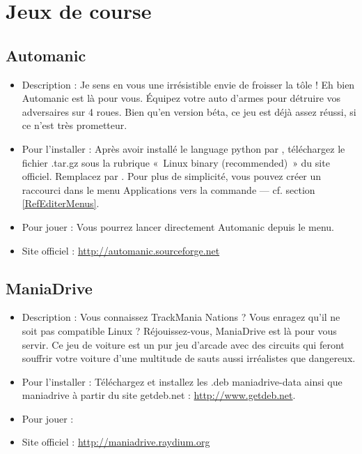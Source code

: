 \section{Jeux de course}
\subsection{Automanic}
\begin{itemize}
\begingroup
{}
\item Description : Je sens en vous une irrésistible envie de froisser la tôle ! Eh bien Automanic est là pour vous. Équipez votre auto d'armes pour détruire vos adversaires sur 4 roues. Bien qu'en version béta, ce jeu est déjà assez réussi, si ce n'est très prometteur.{\par}
\endgroup
\item Pour l'installer : Après avoir installé le language python par , téléchargez le fichier .tar.gz sous la rubrique «~Linux binary (recommended)~» du site officiel. Remplacez  par . Pour plus de simplicité, vous pouvez créer un raccourci dans le menu Applications vers la commande  --- cf. section \ref{RefEditerMenus}.{\par}
\item Pour jouer : Vous pourrez lancer directement Automanic depuis le menu.{\par}
\item Site officiel : \url{http://automanic.sourceforge.net}{\par}
\end{itemize}
\subsection{ManiaDrive}
\begin{itemize}
\begingroup
{}
\item Description : Vous connaissez TrackMania Nations ? Vous enragez qu'il ne soit pas compatible Linux ? Réjouissez-vous, ManiaDrive est là pour vous servir. Ce jeu de voiture est un pur jeu d'arcade avec des circuits qui feront souffrir votre voiture d'une multitude de sauts aussi irréalistes que dangereux.{\par}
\endgroup
\item Pour l'installer : Téléchargez et installez les .deb maniadrive-data ainsi que maniadrive à partir du site getdeb.net :
\url{http://www.getdeb.net}.{\par}
\item Pour jouer : 
\item Site officiel : \url{http://maniadrive.raydium.org}{\par}
\end{itemize}
